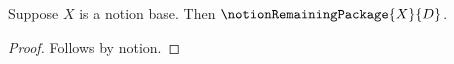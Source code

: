 

\begin{proposition}\label{notion_package_reverse}
    Suppose $X$ is a notion base.
    Then $\notionRemainingPackage{X}{D}$.
\end{proposition}
\begin{proof}
    Follows by notion.
\end{proof}
